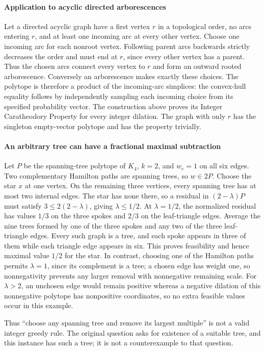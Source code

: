 \documentclass[11pt]{article}
\begin{document}
\paragraph{Application to acyclic directed arborescences}
Let a directed acyclic graph have a first vertex $r$ in a topological order, no arcs entering $r$, and at least one incoming arc at every other vertex. Choose one incoming arc for each nonroot vertex. Following parent arcs backwards strictly decreases the order and must end at $r$, since every other vertex has a parent. Thus the chosen arcs connect every vertex to $r$ and form an outward rooted arborescence. Conversely an arborescence makes exactly these choices. The polytope is therefore a product of the incoming-arc simplices: the convex-hull equality follows by independently sampling each incoming choice from its specified probability vector. The construction above proves its Integer Caratheodory Property for every integer dilation. The graph with only $r$ has the singleton empty-vector polytope and has the property trivially.

\paragraph{An arbitrary tree can have a fractional maximal subtraction}
Let $P$ be the spanning-tree polytope of $K_4$, $k=2$, and $w_e=1$ on all six edges. Two complementary Hamilton paths are spanning trees, so $w\in2P$. Choose the star $x$ at one vertex. On the remaining three vertices, every spanning tree has at most two internal edges. The star has none there, so a residual in $(2-\lambda)P$ must satisfy $3\leq2(2-\lambda)$, giving $\lambda\leq1/2$. At $\lambda=1/2$, the normalized residual has values $1/3$ on the three spokes and $2/3$ on the leaf-triangle edges. Average the nine trees formed by one of the three spokes and any two of the three leaf-triangle edges. Every such graph is a tree, and each spoke appears in three of them while each triangle edge appears in six. This proves feasibility and hence maximal value $1/2$ for the star. In contrast, choosing one of the Hamilton paths permits $\lambda=1$, since its complement is a tree; a chosen edge has weight one, so nonnegativity prevents any larger removal with nonnegative remaining scale. For $\lambda>2$, an unchosen edge would remain positive whereas a negative dilation of this nonnegative polytope has nonpositive coordinates, so no extra feasible values occur in this example.

Thus ``choose any spanning tree and remove its largest multiple'' is not a valid integer greedy rule. The original question asks for existence of a suitable tree, and this instance has such a tree; it is not a counterexample to that question.
\end{document}
